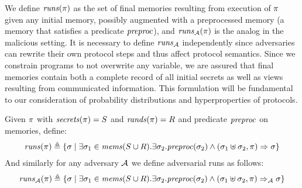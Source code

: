 We define $\mathit{runs}(\pi)$ as the set of final memories resulting from
execution of $\pi$ given any initial memory, possibly augmented with
a preprocessed memory (a memory that satisfies a predicate
$\mathit{preproc}$), and $\mathit{runs}_{\mathcal{A}}(\pi)$ is the analog in the malicious
setting. It is necessary to define $\mathit{runs}_{\mathcal{A}}$ independently since
adversaries can rewrite their own protocol steps and thus affect
protocol semantics. Since we constrain programs to not overwrite any
variable, we are assured that final memories contain both a complete
record of all initial secrets as well as views resulting from
communicated information. This formulation will be fundamental to our
consideration of probability distributions and hyperproperties of
protocols.
\begin{definition}
  \label{def-runs}
  Given $\pi$ with $\mathit{secrets}(\pi) = S$ and $\mathit{rands}(\pi) = R$ and
  predicate $\mathit{preproc}$ on memories, define:
  $$
  \begin{array}{c}
    \mathit{runs}(\pi) \triangleq 
    \{ \sigma \mid \exists \sigma_1 \in \mathit{mems}(S \cup R) . 
    \exists \sigma_2 . \mathit{preproc}(\sigma_2) \wedge
    (\sigma_1 \uplus \sigma_2,\pi) \Rightarrow \sigma \}
  \end{array}
  $$
  And similarly for any adversary $\mathcal{A}$ we define adversarial runs
  as follows:
  $$
  \begin{array}{c}
    \mathit{runs}_{\mathcal{A}}(\pi) \triangleq 
    \{ \sigma \mid \exists \sigma_1 \in \mathit{mems}(S \cup R) . 
    \exists \sigma_2 . \mathit{preproc}(\sigma_2) \wedge
    (\sigma_1 \uplus \sigma_2,\pi) \Rightarrow_{\mathcal{A}} \sigma \}
  \end{array}
  $$
\end{definition}
